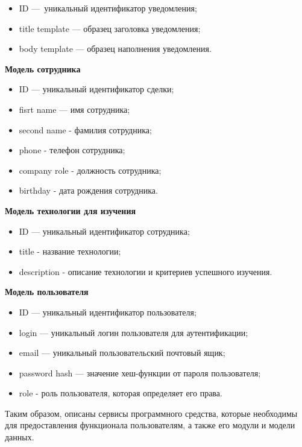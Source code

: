 \begin{itemize}
    \item ID — уникальный идентификатор уведомления;
    \item title template — образец заголовка уведомления;
    \item body template — образец наполнения уведомления.
\end{itemize}

\bigskip
\textbf{Модель сотрудника}

\begin{itemize}
    \item ID — уникальный идентификатор сделки;
    \item fisrt name — имя сотрудника;
    \item second name - фамилия сотрудника;
    \item phone - телефон сотрудника;
    \item company role - должность сотрудника;
    \item birthday - дата рождения сотрудника.
\end{itemize}

\bigskip
\textbf{Модель технологии для изучения}

\begin{itemize}
    \item ID — уникальный идентификатор сотрудника;
    \item title - название технологии;
    \item description - описание технологии и критериев успешного изучения.
\end{itemize}

\bigskip
\textbf{Модель пользователя}

\begin{itemize}
    \item ID — уникальный идентификатор пользователя;
    \item login — уникальный логин пользователя для аутентификации;
    \item email — уникальный пользовательский почтовый ящик;
    \item password hash — значение хеш-функции от пароля пользователя;
    \item role - роль пользователя, которая определяет его права.
\end{itemize}

Таким образом, описаны сервисы программного средства, которые необходимы для предоставления функционала пользователям, а также его модули и модели данных.   
